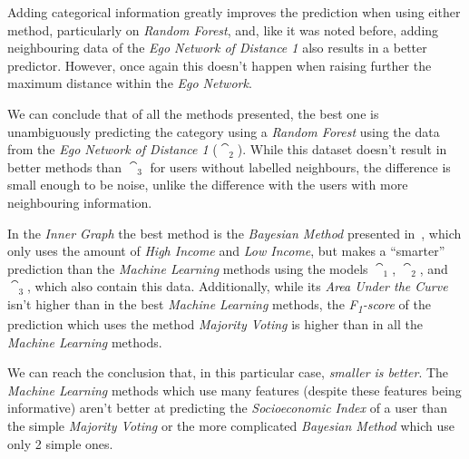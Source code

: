 Adding categorical information greatly improves the prediction when using either method, particularly on \emph{Random Forest}, and, like it was noted before, adding neighbouring data of the \emph{Ego Network of Distance 1} also results in a better predictor. However, once again this doesn't happen when raising further the maximum distance within the \emph{Ego Network}.

We can conclude that of all the methods presented, the best one is unambiguously predicting the category using a \emph{Random Forest} using the data from the \emph{Ego Network of Distance 1} ($\cat_2$). While this dataset doesn't result in better methods than $\cat_3$ for users without labelled neighbours, the difference is small enough to be noise, unlike the difference with the users with more neighbouring information.

In the \emph{Inner Graph} the best method is the \emph{Bayesian Method} presented in~\cite{fixmanasonam2016}, which only uses the amount of \emph{High Income} and \emph{Low Income}, but makes a ``smarter'' prediction than the \emph{Machine Learning} methods using the models $\cat_1$, $\cat_2$, and $\cat_3$, which also contain this data. Additionally, while its \emph{Area Under the Curve} isn't higher than in the best \emph{Machine Learning} methods, the \emph{F\textsubscript{1}-score} of the prediction which uses the method \emph{Majority Voting} is higher than in all the \emph{Machine Learning} methods.

We can reach the conclusion that, in this particular case, \emph{smaller is better}. The \emph{Machine Learning} methods which use many features (despite these features being informative) aren't better at predicting the \emph{Socioeconomic Index} of a user than the simple \emph{Majority Voting} or the more complicated \emph{Bayesian Method} which use only 2 simple ones.
